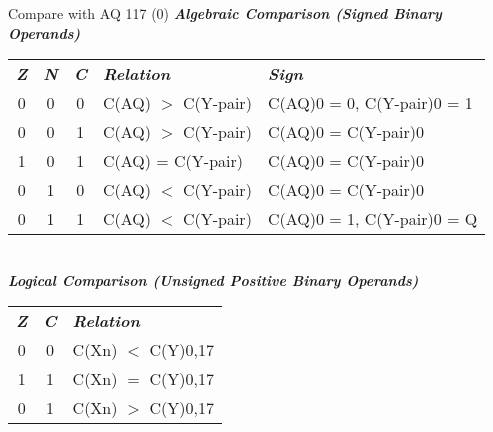 { {Compare with AQ} {117 (0)}
\inbif
{}
\indcs
\inina
{}
\textbf{\textsl{Algebraic Comparison (Signed Binary Operands)}}\\
\begin{tabular}{c c c l l}
\textit{\textbf{Z}} & 
\textit{\textbf{N}} & 
\textit{\textbf{C}} & 
\textit{\textbf{Relation}} & 
\textit{\textbf{Sign}} \\
0 & 0 & 0 & C(AQ) $>$ C(Y-pair) & C(AQ)0 = 0, C(Y-pair)0 = 1 \\
0 & 0 & 1 & C(AQ) $>$ C(Y-pair) & C(AQ)0 = C(Y-pair)0 \\
1 & 0 & 1 & C(AQ) = C(Y-pair) & C(AQ)0 = C(Y-pair)0 \\
0 & 1 & 0 & C(AQ) $<$ C(Y-pair) & C(AQ)0 = C(Y-pair)0 \\
0 & 1 & 1 & C(AQ) $<$ C(Y-pair) & C(AQ)0 = 1, C(Y-pair)0 = Q \\
\end{tabular} \\
\textit{\textbf{Logical Comparison (Unsigned Positive Binary Operands)}}\\
\begin{tabular}{c c l}
\textit{\textbf{Z}} & 
\textit{\textbf{C}} & 
\textit{\textbf{Relation}} \\
0 & 0 & C(Xn) $<$ C(Y)0,17 \\
1 & 1 & C(Xn) $=$ C(Y)0,17 \\
0 & 1 & C(Xn) $>$ C(Y)0,17 \\
\end{tabular}












}
